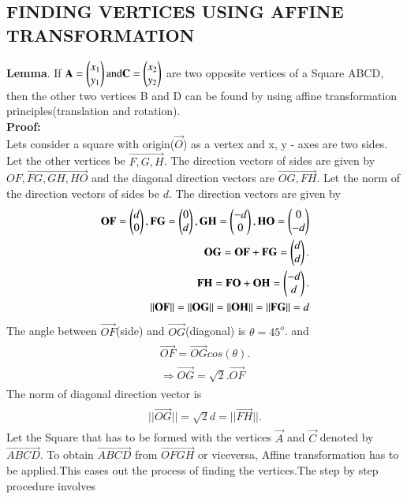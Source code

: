 \documentclass[journal,12pt,twocolumn]{IEEEtran}
\begin{document}
\subsection{FINDING VERTICES USING AFFINE TRANSFORMATION}
\textbf{Lemma}.
If $\mathbf{A}=\begin{pmatrix}x_1\\y_1\end{pmatrix} \text{and} \mathbf{C}=\begin{pmatrix}x_2\\y_2\end{pmatrix}$ are two opposite vertices of a Square ABCD, then the other two vertices B and D can be found by using affine transformation principles(translation and rotation).
\\
\textbf{Proof:}
\\
Lets consider a square with origin($\vec{O}$) as a vertex and x, y - axes are two sides.  Let the other vertices be $\vec{F,G,H}$. The direction vectors of sides are given by $\vec{OF, FG, GH, HO}$ and the diagonal direction vectors are $\vec{OG, FH}$. Let the norm of the direction vectors of sides be $d$. The direction vectors are given by
\begin{align}
\begin{split}
\mathbf{OF}=\begin{pmatrix}d\\0\end{pmatrix},\mathbf{FG}=\begin{pmatrix}0\\d\end{pmatrix},\mathbf{GH}=\begin{pmatrix}-d\\0\end{pmatrix},\mathbf{HO}=\begin{pmatrix}0\\-d\end{pmatrix}\\
\mathbf{OG}=\mathbf{OF}+\mathbf{FG}=\begin{pmatrix}d\\d\end{pmatrix}.\\
\mathbf{FH}=\mathbf{FO}+\mathbf{OH}=\begin{pmatrix}-d\\d\end{pmatrix}.\\
||\mathbf{OF}||=||\mathbf{OG}||=||\mathbf{OH}||=||\mathbf{FG}||=d\\
\end{split}
\end{align}
The angle between $\vec{OF}$(side) and $\vec{OG}$(diagonal) is  $\theta = 45^{o}$. and
\begin{align}
\begin{split}
\vec{OF} = \vec{OG} cos(\theta).\\
\Rightarrow\vec{OG} = \sqrt{2}.\vec{OF}
\end{split}
\end{align}
The norm of diagonal direction vector is
\begin{align}
\begin{split}
||\vec{OG}||=\sqrt{2}d=||\vec{FH}||.
\end{split}
\end{align}
Let the Square that has to be formed with the vertices $\vec{A}$ and $\vec{C}$ denoted by $\vec{ABCD}$. To obtain $\vec{ABCD}$ from $\vec{OFGH}$ or viceversa, Affine transformation has to be applied.This eases out the process of finding the vertices.The step by step procedure involves
\end{document}
